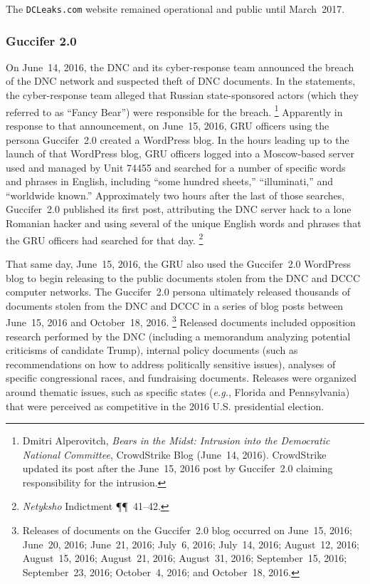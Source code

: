 The \verb+DCLeaks.com+ website remained operational and public until March~2017.

\subsubsection{Guccifer 2.0}

On June~14, 2016, the DNC and its cyber-response team announced the breach of the DNC network and suspected theft of DNC documents.
In the statements, the cyber-response team alleged that Russian state-sponsored actors (which they referred to as ``Fancy Bear'') were responsible for the breach.%
\footnote{Dmitri Alperovitch, \textit{Bears in the Midst: Intrusion into the Democratic National Committee}, CrowdStrike Blog (June~14, 2016).
CrowdStrike updated its post after the June~15, 2016 post by Guccifer~2.0 claiming responsibility for the intrusion.}
Apparently in response to that announcement, on June~15, 2016, GRU officers using the persona Guccifer~2.0 created a WordPress blog.
In the hours leading up to the launch of that WordPress blog, GRU officers logged into a Moscow-based server used and managed by Unit 74455 and searched for a number of specific words and phrases in English, including ``some hundred sheets,'' ``illuminati,'' and ``worldwide known.''
Approximately two hours after the last of those searches, Guccifer~2.0 published its first post, attributing the DNC server hack to a lone Romanian hacker and using several of the unique English words and phrases that the GRU officers had searched for that day.%
\footnote{\textit{Netyksho} Indictment \P\P~41--42.}

That same day, June~15, 2016, the GRU also used the Guccifer~2.0 WordPress blog to begin releasing to the public documents stolen from the DNC and DCCC computer networks.
The Guccifer~2.0 persona ultimately released thousands of documents stolen from the DNC and DCCC in a series of blog posts between June~15, 2016 and October~18, 2016.%
\footnote{Releases of documents on the Guccifer~2.0 blog occurred on June~15, 2016;
June~20, 2016;
June~21, 2016;
July~6, 2016;
July~14, 2016;
August~12, 2016;
August~15, 2016;
August~21, 2016;
August~31, 2016;
September~15, 2016;
September~23, 2016;
October~4, 2016;
and October~18, 2016.}
Released documents included opposition research performed by the DNC (including a memorandum analyzing potential criticisms of candidate Trump), internal policy documents (such as recommendations on how to address politically sensitive issues), analyses of specific congressional races, and fundraising documents.
Releases were organized around thematic issues, such as specific states (\textit{e.g.}, Florida and Pennsylvania) that were perceived as competitive in the 2016 U.S. presidential election.


